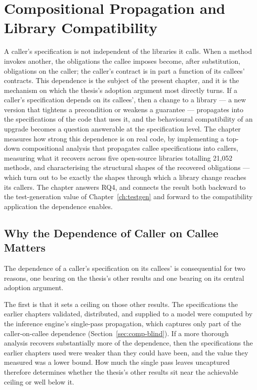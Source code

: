 \chapter{Compositional Propagation and Library Compatibility}
\label{ch:compositional}

A caller's specification is not independent of the libraries it calls. When a
method invokes another, the obligations the callee imposes become, after
substitution, obligations on the caller; the caller's contract is in part a
function of its callees' contracts. This dependence is the subject of the present
chapter, and it is the mechanism on which the thesis's adoption argument most
directly turns. If a caller's specification depends on its callees', then a change
to a library --- a new version that tightens a precondition or weakens a guarantee
--- propagates into the specifications of the code that uses it, and the
behavioural compatibility of an upgrade becomes a question answerable at the
specification level. The chapter measures how strong this dependence is on real
code, by implementing a top-down compositional analysis that propagates callee
specifications into callers, measuring what it recovers across five open-source
libraries totalling 21{,}052 methods, and characterising the structural shapes of
the recovered obligations --- which turn out to be exactly the shapes through which
a library change reaches its callers. The chapter answers RQ4, and connects the
result both backward to the test-generation value of Chapter~\ref{ch:testgen} and
forward to the compatibility application the dependence enables.

\section{Why the Dependence of Caller on Callee Matters}
\label{sec:comp-why}

The dependence of a caller's specification on its callees' is consequential for
two reasons, one bearing on the thesis's other results and one bearing on its
central adoption argument.

The first is that it sets a ceiling on those other results. The specifications the
earlier chapters validated, distributed, and supplied to a model were computed by
the inference engine's single-pass propagation, which captures only part of the
caller-on-callee dependence (Section~\ref{sec:comp-blind}). If a more thorough
analysis recovers substantially more of the dependence, then the specifications the
earlier chapters used were weaker than they could have been, and the value they
measured was a lower bound. How much the single pass leaves uncaptured therefore
determines whether the thesis's other results sit near the achievable ceiling or
well below it.

